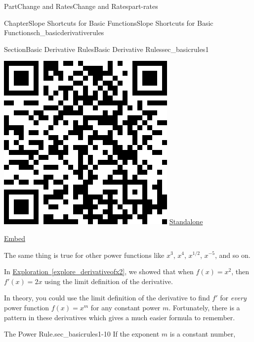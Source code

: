 \documentclass{tufte-book}
\newcommand{\xreffont}{\relax}
\numberwithin{equation}{chapter}
\begin{document}
\begin{partptx}{Part}{Change and Rates}{}{Change and Rates}{}{}{part-rates}
\begin{chapterptx}{Chapter}{Slope Shortcuts for Basic Functions}{}{Slope Shortcuts for Basic Functions}{}{}{ch_basicderivativerules}
\begin{sectionptx}{Section}{Basic Derivative Rules}{}{Basic Derivative Rules}{}{}{sec_basicrules1}
\begin{sidebyside}{2}{0.075}{0.075}{0.17}
\begin{sbspanel}{0.47}
\end{sbspanel}%
\begin{sbspanel}{0.21}%
\includegraphics[width=\linewidth]{generated/qrcode/sec_basicrules1-7-6.png}
\href{http://webwork.bridgew.edu/oer/functions_at_work/sec_basicrules1-7-6.html}{Standalone}%
\par
\href{http://webwork.bridgew.edu/oer/functions_at_work/sec_basicrules1-7-6-if.html}{Embed}%
\end{sbspanel}%
\end{sidebyside}%
 The same thing is true for other power functions like \(x^3\), \(x^4\), \(x^{1/2}\), \(x^{-5}\), and so on.%
\par
In \hyperref[explore_derivativeofx2]{Exploration~{\xreffont\ref{explore_derivativeofx2}}}, we showed that when \(f(x) = x^2\), then \(f'(x) = 2x\) using the limit definition of the derivative.%
\par
In theory, you could use the limit definition of the derivative to find \(f'\) for \emph{every} power function \(f(x) = x^m\) for any constant power \(m\). Fortunately, there is a pattern in these derivatives which gives a much easier formula to remember.%
\begin{paragraphs}{The Power Rule.}{sec_basicrules1-10}%
If the exponent \(m\) is a constant number,%
\begin{equation*}

\end{equation*}
\end{paragraphs}
\end{sectionptx}
\end{chapterptx}
\end{partptx}
\end{document}

